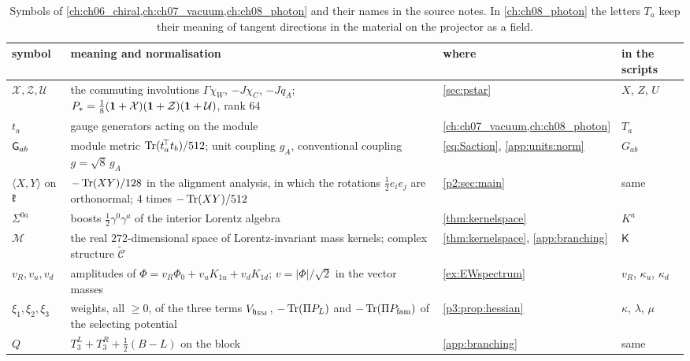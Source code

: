 \begin{table}[ht]
\centering\small
\begin{tabular}{@{}>{\raggedright\arraybackslash}p{2.6cm}>{\raggedright\arraybackslash}p{6.0cm}>{\raggedright\arraybackslash}p{2.6cm}>{\raggedright\arraybackslash}p{2.4cm}@{}}
\toprule
symbol & meaning and normalisation & where & in the scripts\\
\midrule
$\mathcal X,\mathcal Z,\mathcal U$ & the commuting involutions $\Gamma\chi_W$, $-J\chi_C$, $-Jq_A$; $P_*=\tfrac18(\mathbf 1+\mathcal X)(\mathbf 1+\mathcal Z)(\mathbf 1+\mathcal U)$, rank $64$ & \cref{sec:pstar} & $X$, $Z$, $U$\\
$t_a$ & gauge generators acting on the module & \cref{ch:ch07_vacuum,ch:ch08_photon} & $T_a$\\
$\mathsf G_{ab}$ & module metric $\operatorname{Tr}(t_a^{\!\top}t_b)/512$; unit coupling $g_A$, conventional coupling $g=\sqrt8\,g_A$ & \cref{eq:Saction}, \cref{app:units:norm} & $G_{ab}$\\
$\langle X,Y\rangle$ on $\mathfrak k$ & $-\operatorname{Tr}(XY)/128$ in the alignment analysis, in which the rotations $\tfrac12e_ie_j$ are orthonormal; $4$ times $-\operatorname{Tr}(XY)/512$ & \cref{p2:sec:main} & same\\
$\Sigma^{0a}$ & boosts $\tfrac12\gamma^0\gamma^a$ of the interior Lorentz algebra & \cref{thm:kernelspace} & $K^a$\\
$\mathcal M$ & the real $272$-dimensional space of Lorentz-invariant mass kernels; complex structure $\widetilde{\mathcal C}$ & \cref{thm:kernelspace}, \cref{app:branching} & $\mathsf K$\\
$v_R,v_u,v_d$ & amplitudes of $\Phi=v_R\Phi_0+v_uK_{1u}+v_dK_{1d}$; $v=\lvert\Phi\rvert/\sqrt2$ in the vector masses & \cref{ex:EWspectrum} & $v_R$, $\kappa_u$, $\kappa_d$\\
$\xi_1,\xi_2,\xi_3$ & weights, all $\ge0$, of the three terms $V_{\mathfrak h_{\rm SM}}$, $-\operatorname{Tr}(\Pi P_L)$ and $-\operatorname{Tr}(\Pi P_{\rm fam})$ of the selecting potential & \cref{p3:prop:hessian} & $\kappa$, $\lambda$, $\mu$\\
$Q$ & $T^L_3+T^R_3+\tfrac12(B-L)$ on the block & \cref{app:branching} & same\\
\bottomrule
\end{tabular}
\caption{Symbols of \cref{ch:ch06_chiral,ch:ch07_vacuum,ch:ch08_photon} and their names in the source notes. In \cref{ch:ch08_photon} the
letters $T_a$ keep their meaning of tangent directions in the material on the projector as a field.}
\label{tab:app:symbols}
\end{table}
